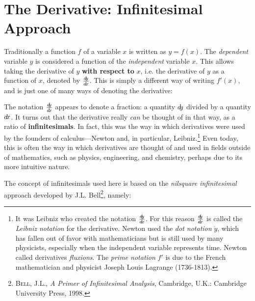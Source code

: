 \section{The Derivative: Infinitesimal Approach}
Traditionally a function $f$ of a variable $x$ is written as $y=f(x)$. The
\emph{dependent} variable $y$ is considered a function of the \emph{independent}
variable $x$. This allows taking the derivative of $y$ \textbf{with respect to}
$x$, i.e. the derivative of $y$ as a function of $x$, denoted by
$\frac{d\negmedspace y}{d\!x}$. This is simply a different way of writing $f'(x)$, and is just one of
many ways of denoting the derivative:\index{$\dx$}


The notation $\frac{d\negmedspace y}{d\!x}$ appears to denote a fraction: a quantity $d\!y$
divided by a quantity $\dx$. It turns out that the derivative really \emph{can}
be thought of in that way, as a ratio of \textbf{infinitesimals}. In fact,
this was the way in which derivatives were used by the founders
of calculus---Newton and, in particular, Leibniz.\footnote{It was
Leibniz who created the notation $\frac{d\negmedspace y}{d\!x}$. For this reason $\frac{d\negmedspace y}{d\!x}$ is called
the \emph{Leibniz notation} for the derivative. Newton
used the \emph{dot notation} $\dot{y}$, which has fallen out of favor with
mathematicians but is still used by many physicists, especially when the
independent variable represents time. Newton called derivatives \emph{fluxions}.
The \emph{prime notation} $f'$ is due to the French mathematician and physicist
Joseph Louis Lagrange (1736-1813).} Even today, this is
often the way in which derivatives are thought of and used in fields outside of
mathematics, such as physics, engineering, and chemistry, perhaps due to its
more intuitive nature.

The concept of infinitesimals used here
is based on the \emph{nilsquare infinitesimal} approach developed by J.L.
Bell\footnote{\textsc{Bell, J.L.}, \emph{A Primer of Infinitesimal Analysis}, 
Cambridge, U.K.: Cambridge University Press, 1998.}, namely:

